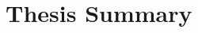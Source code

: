 \documentclass[11pt,twoside,openright]{memoir}
\begin{document}
\begin{CJK*}{UTF8}{gbsn}
\frontmatter

\newpage
\thispagestyle{empty}
\titleCC
\cleardoublepage
\null{}
\begin{flushright}
\end{flushright}
\null

\abstractintoc
\abstractnum

\clearpage

\abstractintoc

 
\cleardoublepage

\tableofcontents
\clearpage
\listoffigures
\clearpage
\listoftables




\mainmatter

\renewcommand\thepart{\Alph{part}}
\part{Thesis Summary}


\end{CJK*}
\end{document}
